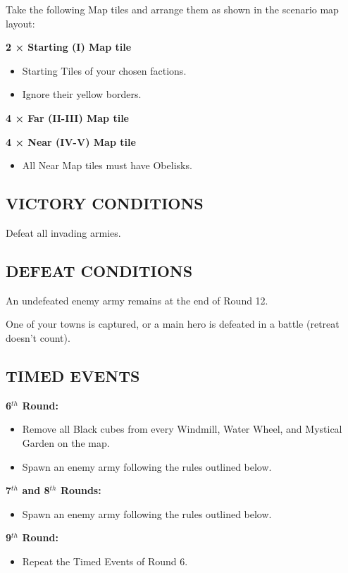 \begin{multicols*}{2}
Take the following Map tiles and arrange them as shown in the scenario map layout:

\textbf{2 × Starting (I) Map tile}
\begin{itemize}
  \item Starting Tiles of your chosen factions.
  \item Ignore their yellow borders.
\end{itemize}

\textbf{4 × Far (II-III) Map tile}

\textbf{4 × Near (IV-V) Map tile}
\begin{itemize}
  \item All Near Map tiles must have Obelisks.
\end{itemize}

\subsection*{\MakeUppercase{Victory Conditions}}

Defeat all invading armies.

\subsection*{\MakeUppercase{Defeat Conditions}}

An undefeated enemy army remains at the end of Round 12.

One of your towns is captured, or a main hero is defeated in a battle (retreat doesn't count).

\subsection*{\MakeUppercase{Timed Events}}

\textbf{6$^{th}$ Round:}
\begin{itemize}
  \item Remove all Black cubes from every Windmill, Water Wheel, and Mystical Garden on the map.
  \item Spawn an enemy army following the rules outlined below.
\end{itemize}

\textbf{7$^{th}$ and 8$^{th}$ Rounds:}
\begin{itemize}
  \item Spawn an enemy army following the rules outlined below.
\end{itemize}

\textbf{9$^{th}$ Round:}
\begin{itemize}
  \item Repeat the Timed Events of Round 6.
\end{itemize}


\end{multicols*}
